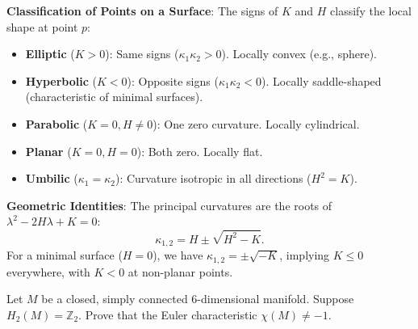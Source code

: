 \begin{remark}
\textbf{Classification of Points on a Surface}:
The signs of $K$ and $H$ classify the local shape at point $p$:
\begin{itemize}
    \item \textbf{Elliptic} ($K > 0$): Same signs ($\kappa_1 \kappa_2 > 0$). Locally convex (e.g., sphere).
    \item \textbf{Hyperbolic} ($K < 0$): Opposite signs ($\kappa_1 \kappa_2 < 0$). Locally saddle-shaped (characteristic of minimal surfaces).
    \item \textbf{Parabolic} ($K = 0, H \neq 0$): One zero curvature. Locally cylindrical.
    \item \textbf{Planar} ($K = 0, H = 0$): Both zero. Locally flat.
    \item \textbf{Umbilic} ($\kappa_1 = \kappa_2$): Curvature isotropic in all directions ($H^2 = K$).
\end{itemize}

\textbf{Geometric Identities}:
The principal curvatures are the roots of $\lambda^2 - 2H\lambda + K = 0$:
\[ \kappa_{1,2} = H \pm \sqrt{H^2 - K}. \]
For a minimal surface ($H=0$), we have $\kappa_{1,2} = \pm \sqrt{-K}$, implying $K \le 0$ everywhere, with $K < 0$ at non-planar points.
\end{remark}

\begin{exercise}
\label{geometry:2024:3}
Let $M$ be a closed, simply connected 6-dimensional manifold. Suppose $H_2(M) = \mathbb{Z}_2$. Prove that the Euler characteristic $\chi(M) \neq -1$.
\end{exercise}

